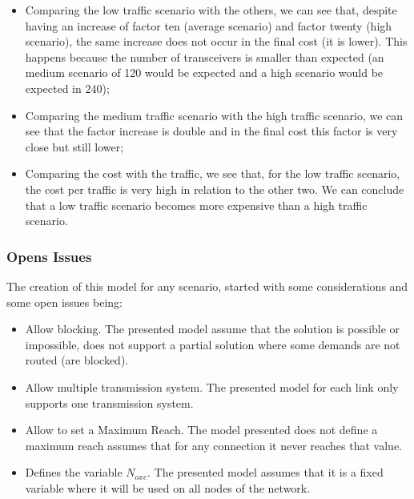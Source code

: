 \begin{itemize}
    \item Comparing the low traffic scenario with the others, we can see that, despite having an increase of factor ten (average scenario) and factor twenty (high scenario), the same increase does not occur in the final cost (it is lower). This happens because the number of transceivers is smaller than expected (an medium scenario of 120 would be expected and a high scenario would be expected in 240);
    \item Comparing the medium traffic scenario with the high traffic scenario, we can see that the factor increase is double and in the final cost this factor is very close but still lower;
    \item Comparing the cost with the traffic, we see that, for the low traffic scenario, the cost per traffic is very high in relation to the other two. We can conclude that a low traffic scenario becomes more expensive than a high traffic scenario.
\end{itemize}

\subsubsection{Opens Issues}

The creation of this model for any scenario, started with some considerations and some open issues being:

\begin{itemize}
  \item Allow blocking.
  \subitem The presented model assume that the solution is possible or impossible, does not support a partial solution where some demands are not routed (are blocked).
  \item Allow multiple transmission system.
  \subitem The presented model for each link only supports one transmission system.
  \item Allow to set a Maximum Reach.
  \subitem The model presented does not define a maximum reach assumes that for any connection it never reaches that value.
  \item Defines the variable $N_{oxc}$.
  \subitem The presented model assumes that it is a fixed variable where it will be used on all nodes of the network.
\end{itemize}

